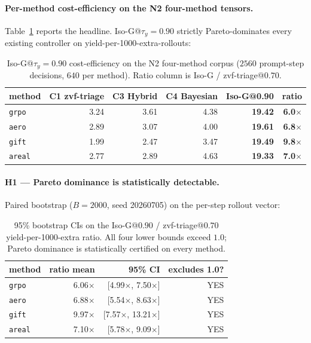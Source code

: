 \paragraph{Per-method cost-efficiency on the N2 four-method tensors.}
Table~\ref{tab:p7-iso-g-cost-eff} reports the headline.  Iso-G@$\tau_y{=}0.90$
strictly Pareto-dominates every existing controller on
yield-per-1000-extra-rollouts:

\begin{table}[t]
\centering\small
\caption{Iso-G@$\tau_y{=}0.90$ cost-efficiency on the N2 four-method
corpus ($2560$ prompt-step decisions, $640$ per method).  Ratio column
is Iso-G / zvf-triage@$0.70$.}
\label{tab:p7-iso-g-cost-eff}
\begin{tabular}{lrrrrr}
\toprule
method & C1 zvf-triage & C3 Hybrid & C4 Bayesian & \textbf{Iso-G@0.90} & \textbf{ratio} \\
\midrule
\texttt{grpo}  &  3.24 &  3.61 &  4.38 &  \textbf{19.42} & \textbf{6.0$\times$} \\
\texttt{aero}  &  2.89 &  3.07 &  4.00 &  \textbf{19.61} & \textbf{6.8$\times$} \\
\texttt{gift}  &  1.99 &  2.47 &  3.47 &  \textbf{19.49} & \textbf{9.8$\times$} \\
\texttt{areal} &  2.77 &  2.89 &  4.63 &  \textbf{19.33} & \textbf{7.0$\times$} \\
\bottomrule
\end{tabular}
\end{table}

\paragraph{H1 --- Pareto dominance is statistically detectable.}
Paired bootstrap ($B{=}2000$, seed 20260705) on the per-step rollout
vector:

\begin{table}[t]
\centering\small
\caption{95\% bootstrap CIs on the Iso-G@$0.90$ / zvf-triage@$0.70$
yield-per-1000-extra ratio.  All four lower bounds exceed $1.0$;
Pareto dominance is statistically certified on every method.}
\label{tab:p7-iso-g-ci}
\begin{tabular}{lrrr}
\toprule
method & ratio mean & 95\% CI & excludes 1.0? \\
\midrule
\texttt{grpo}  &  6.06$\times$ & [4.99$\times$, 7.50$\times$] & YES \\
\texttt{aero}  &  6.88$\times$ & [5.54$\times$, 8.63$\times$] & YES \\
\texttt{gift}  &  9.97$\times$ & [7.57$\times$, 13.21$\times$] & YES \\
\texttt{areal} &  7.10$\times$ & [5.78$\times$, 9.09$\times$] & YES \\
\bottomrule
\end{tabular}
\end{table}

